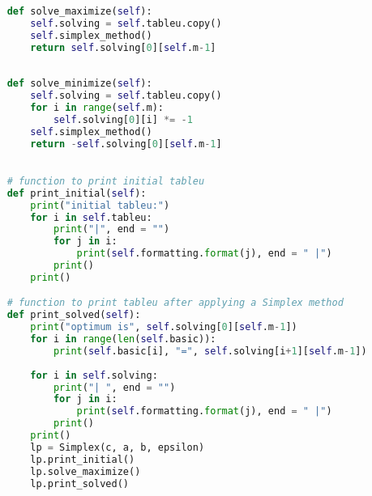 \documentclass[12pt, legalpaper]{exam}
\begin{document}
\begin{lstlisting}[language=Python, caption=Программа на Python, label=lst:python-code]
    
    def solve_maximize(self):
        self.solving = self.tableu.copy()
        self.simplex_method()
        return self.solving[0][self.m-1]
        
    
    def solve_minimize(self): 
        self.solving = self.tableu.copy()
        for i in range(self.m):
            self.solving[0][i] *= -1
        self.simplex_method()
        return -self.solving[0][self.m-1]

    
    # function to print initial tableu
    def print_initial(self):
        print("initial tableu:")
        for i in self.tableu:
            print("|", end = "")
            for j in i:
                print(self.formatting.format(j), end = " |")
            print()
        print()

    # function to print tableu after applying a Simplex method
    def print_solved(self):
        print("optimum is", self.solving[0][self.m-1])
        for i in range(len(self.basic)):
            print(self.basic[i], "=", self.solving[i+1][self.m-1])
            
        for i in self.solving:
            print("| ", end = "")
            for j in i:
                print(self.formatting.format(j), end = " |")
            print()
        print()
        lp = Simplex(c, a, b, epsilon)
        lp.print_initial()
        lp.solve_maximize()
        lp.print_solved()
\end{lstlisting}
\end{document}
